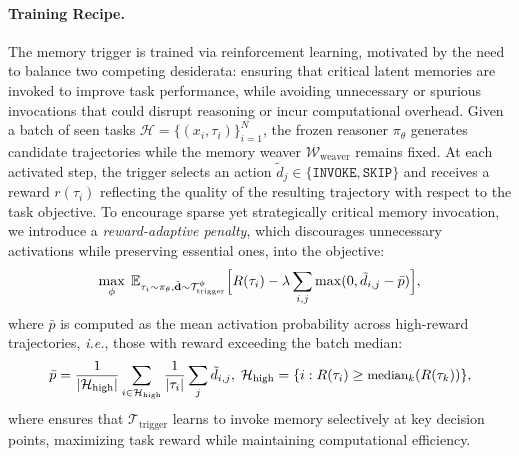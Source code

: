 \documentclass[]{fairmeta}
\begin{document}
\paragraph{Training Recipe.}  The memory trigger is trained via reinforcement learning, motivated by the need to balance two competing desiderata: ensuring that critical latent memories are invoked to improve task performance, while avoiding unnecessary or spurious invocations that could disrupt reasoning or incur computational overhead. Given a batch of seen tasks $\mathcal{H} = \{(x_i, \tau_i)\}_{i=1}^N$, the frozen reasoner $\pi_\theta$ generates candidate trajectories while the memory weaver $\mathcal{W}_\text{weaver}$ remains fixed. At each activated step, the trigger selects an action $\tilde{d}_j \in \{\texttt{INVOKE}, \texttt{SKIP}\}$ and receives a reward $r(\tau_i)$ reflecting the quality of the resulting trajectory with respect to the task objective. 
To encourage sparse yet strategically critical memory invocation, we introduce a \textit{reward-adaptive penalty}, which discourages unnecessary activations while preserving essential ones, into the objective:
\begin{equation}
\small
\max_\phi \; \mathbb{E}_{\tau_i \sim \pi_\theta, \tilde{\mathbf{d}} \sim \mathcal{T}_\text{trigger}^\phi} \Big[ R(\tau_i) - \lambda \sum_{i,j} \max(0, \tilde{d}_{i,j} - \bar{p}) \Big],
\end{equation}
where $\bar{p}$ is computed as the mean activation probability across high-reward trajectories, \textit{i.e.}, those with reward exceeding the batch median:
\begin{equation}
\small
\bar{p} = \frac{1}{|\mathcal{H}_\text{high}|} \sum_{i \in \mathcal{H}_\text{high}} \frac{1}{|\tau_i|} \sum_j \tilde{d}_{i,j}, \; \mathcal{H}_\text{high} = \{ i : R(\tau_i) \ge \text{median}_{k}(R(\tau_k)) \},
\end{equation}
where ensures that $\mathcal{T}_\text{trigger}$ learns to invoke memory selectively at key decision points, maximizing task reward while maintaining computational efficiency.




\vspace{-0.6em}
\end{document}
